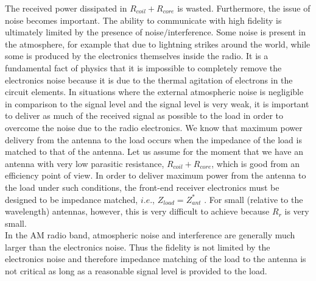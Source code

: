 \documentclass{article}
\begin{document}
The received power dissipated in $R_{coil} + R_{core}$ is wasted. Furthermore, the issue of noise becomes important. The ability to communicate with high fidelity is ultimately limited by the presence of noise$/$interference. Some noise is present in the atmosphere, for example that due to lightning strikes around the world, while some is produced by the electronics themselves inside the radio. It is a fundamental fact of physics that it is impossible to completely remove the electronics noise because it is due to the thermal agitation of electrons in the circuit elements. In situations where the external atmospheric noise is negligible in comparison to the signal level and the signal level is very weak, it is important to deliver as much of the received signal as possible to the load in order to overcome the noise due to the radio electronics. We know that maximum power delivery from the antenna to the load occurs when the impedance of the load is matched to that of the antenna. Let us assume for the moment that we have an antenna with very low parasitic resistance, $R_{coil} + R_{core}$, which is good from an efficiency point of view. In order to deliver maximum power from the antenna to the load under such conditions, the front-end receiver electronics must be designed to be impedance matched, $i.e.$, $Z_{load} = Z_{ant}^{*}$ . For small (relative to the wavelength) antennas, however, this is very difficult to achieve because $R_r$ is very small.\\
In the AM radio band, atmospheric noise and interference are generally much larger than the electronics noise. Thus the fidelity is not limited by the electronics noise and therefore impedance matching of the load to the antenna is not critical as long as a reasonable signal level is provided to the load.
\end{document}
